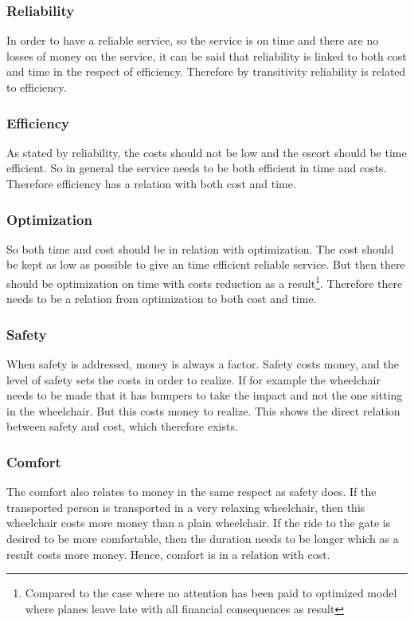 \documentclass[a4paper, 11pt, notitlepage]{report}
\begin{document}
\subsubsection{Reliability}
In order to have a reliable service, so the service is on time and there are no losses of money on the service, it can be said that reliability is linked to both cost and time in the respect of efficiency. Therefore by transitivity reliability is related to efficiency.
\subsubsection{Efficiency}
As stated by reliability, the costs should not be low and the escort should be time efficient. So in general the service needs to be both efficient in time and costs. Therefore efficiency has a relation with both cost and time.
\subsubsection{Optimization}
So both time and cost should be in relation with optimization. The cost should be kept as low as possible to give an time efficient reliable service. But then there should be optimization on time with costs reduction as a result\footnote{Compared to the case where no attention has been paid to optimized model where planes leave late with all financial consequences as result}. Therefore there needs to be a relation from optimization to both cost and time.
\subsubsection{Safety}
When safety is addressed, money is always a factor. Safety costs money, and the level of safety sets the costs in order to realize. If for example the wheelchair needs to be made that it has bumpers to take the impact and not the one sitting in the wheelchair. But this costs money to realize. This shows the direct relation between safety and cost, which therefore exists.
\subsubsection{Comfort}
The comfort also relates to money in the same respect as safety does. If the transported person is transported in a very relaxing wheelchair, then this wheelchair costs more money than a plain wheelchair. If the ride to the gate is desired to be more comfortable, then the duration needs to be longer which as a result costs more money. Hence, comfort is in a relation with cost.
\end{document}
